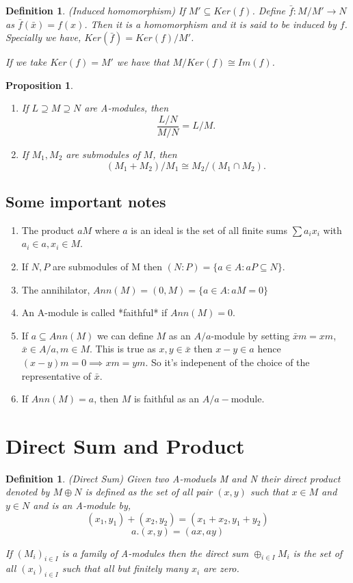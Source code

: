 \documentclass[]{report}
\newtheorem{prop}[theorem]{Proposition}
\newtheorem{defn}[theorem]{Definition}
\begin{document}
\begin{defn} (Induced homomorphism)
    If $M' \subseteq Ker(f)$. Define $\bar f: M/M' \rightarrow N$ as $\bar f(\bar x) = f(x)$. Then it is a homomorphism and it is said to be induced by $f$. Specially we have, $Ker(\bar f) = Ker(f)/M'$.

If we take $Ker(f) = M'$ we have that $M/Ker(f) \cong Im(f)$.
\end{defn}

\begin{prop}
    \begin{enumerate}
        \item If $L \supseteq M \supseteq N$ are A-modules, then 
$$\frac{L/N}{M/N} = L/M.$$
    \item If $M_1,M_2$ are submodules of $M$, then
$$(M_1+M_2)/M_1 \cong M_2/(M_1 \cap M_2).$$
    \end{enumerate}
\end{prop}

\subsection{Some important notes}
\begin{enumerate}
    \item The product $aM$ where $a$ is an ideal is the set of all finite sums $\sum a_i x_i$ with $a_i \in a, x_i \in M$. 
    \item If $N,P$ are submodules of M then $(N:P) = \{a\in A: aP \subseteq N\}$.
    \item The annihilator, $Ann(M) = (0,M) = \{a\in A: aM=0\}$
    \item An A-module is called *faithful* if $Ann(M) = 0$.
    \item If $a \subseteq Ann(M)$ we can define $M$ as an $A/a$-module by setting $\bar x m = xm$, $\bar x\in A/a, m\in M$. This is true as $x,y\in \bar x$ then $x-y \in a$ hence $(x-y)m = 0 \implies xm = ym$. So it's indepenent of the choice of the representative of $\bar x$. 
    \item If $Ann(M) = a$, then $M$ is faithful as an $A/a-$module.
\end{enumerate}

\section{Direct Sum and Product}

\begin{defn} (Direct Sum) Given two A-moduels M and N their direct product denoted by $M \oplus N$ is defined as the set of all pair $(x,y)$ such that $x \in M$ and $y \in N$ and is an A-module by,
$$(x_1,y_1) + (x_2,y_2) = (x_1+x_2, y_1+y_2)$$ 
$$a.(x,y) = (ax,ay)$$
 
If $(M_i)_{i\in I}$ is a family of A-modules then the direct sum $\oplus_{i\in I} M_i$ is the set of all $(x_i)_{i\in I}$ such that all but finitely many $x_i$ are zero. 
\end{defn}
\end{document}
